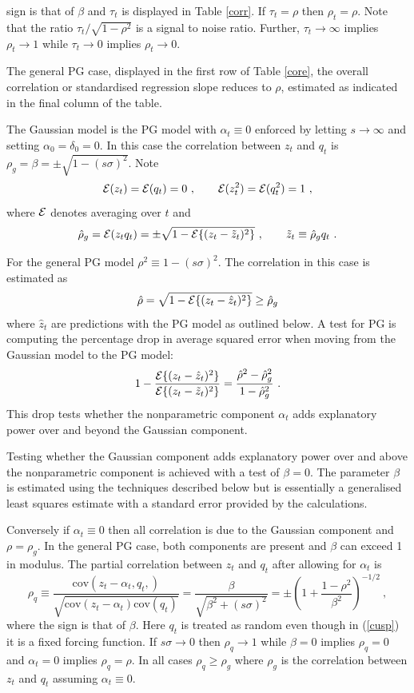 \documentclass[authoryear]{elsarticle}
\newcommand{\cov}{\mathrm{cov}}
\newcommand{\Ex}{{\cal E}}
\newcommand{\eref}[1]{(\ref{#1})}
\newcommand{\tref}[1]{Table \ref{#1}}
\newcommand{\cq}{\ , \qquad}
\newcommand{\be}[1]{\begin{equation}\label{#1}}
\newcommand{\ee}{\end{equation}}
\begin{document}
  sign is that of $\beta$ and $\tau_t$ is displayed in \tref{corr}.   If $\tau_t=\rho$ then $\rho_t=\rho$.  Note that 
the ratio $\tau_t/\sqrt{1-\rho^2}$ is a signal to noise ratio.  Further, $\tau_t\rightarrow\infty$ implies $\rho_t\rightarrow 1$ while $\tau_t\rightarrow 0$ implies $\rho_t\rightarrow 0$.

The general PG case, displayed in the first row of \tref{core}, the overall correlation or standardised regression slope reduces to $\rho$, estimated as indicated in the final column of the table.




The Gaussian model is the PG model with $\alpha_t\equiv 0$ enforced by letting $s\rightarrow\infty$ and setting $\alpha_0=\delta_0=0$.   In this case the correlation between $z_t$ and $q_t$ is $\rho_g=\beta=\pm\sqrt{1-(s\sigma)^2}$.    Note 
$$
\Ex(z_t)=\Ex(q_t)=0\cq \Ex(z_t^2)=\Ex(q_t^2)=1\ ,
$$
where $\Ex$ denotes averaging over $t$ and 
\be{ess}
 \hat\rho_g =\Ex(z_tq_t) =\pm\sqrt{1-\Ex\{(z_t-\tilde z_t)^2\}}\cq \tilde z_t\equiv\hat\rho_gq_t\ .
\ee

For the general PG model  $\rho^2\equiv 1-(s\sigma)^2$.   The correlation in this case  is estimated as 
$$
\hat\rho = \sqrt{1- \Ex\{(z_t-\hat z_t)^2\}}\ge \hat\rho_g
$$
where  $\hat z_t$ are predictions  with the PG model as outlined below.   A test for PG is  computing  the percentage drop in  average squared error when moving from the Gaussian model to the PG model: 
$$
1-\frac{\Ex\{(z_t-\hat z_t)^2\}}{\Ex\{(z_t-\tilde z_t)^2\}} = \frac{\hat \rho^2-\hat \rho^2_g}{1-\hat\rho^2_g}\ .
$$
This drop tests whether the nonparametric component $\alpha_t$ adds  explanatory power over and beyond the Gaussian component.

Testing whether the  Gaussian component adds explanatory power over and above the nonparametric component is achieved with a test of  $\beta=0$.   The parameter $\beta$ is estimated using the techniques described below but is essentially a generalised least squares estimate with a standard error provided by the calculations.    



  Conversely if $\alpha_t\equiv 0$ then all correlation is due to the Gaussian component and $\rho=\rho_g$.  In the general PG case, both components are present and $\beta$ can exceed 1 in modulus. 
The partial correlation between $z_t$ and $q_t$ after allowing for $\alpha_t$ is
\be{rhoq}
\rho_q\equiv\frac{\cov(z_t-\alpha_t,q_t,)}{\sqrt{\cov(z_t-\alpha_t)\cov(q_t)}} = \frac{\beta}{\sqrt{\beta^2+(s\sigma)^2}}=\pm\left(1+\frac{1-\rho^2}{\beta^2}\right)^{-1/2}\ ,
\ee
where the sign is that of $\beta$.  Here $q_t$ is treated as random even though in \eref{cusp} it is a fixed forcing function.  If $s\sigma\rightarrow 0$ then $\rho_q\rightarrow 1$ while $\beta=0$ implies $\rho_q=0$   
and $\alpha_t=0$  implies  $\rho_q=\rho$.  In all cases $\rho_q\ge \rho_g$ where $\rho_g$ is the correlation between $z_t$ and $q_t$ assuming $\alpha_t\equiv 0$.  
\end{document}
